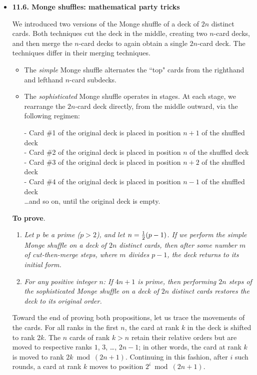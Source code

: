 \begin{itemize}


\medskip\item
{\bf 11.6. Monge shuffles: mathematical party tricks}

\smallskip

We introduced two versions of the Monge shuffle of a deck of $2n$ distinct cards.  Both techniques cut the deck in the middle, creating two $n$-card decks, and then merge the $n$-card decks to again obtain a single $2n$-card deck.  The techniques differ in their merging techniques.
  \begin{itemize}
  \item 
The {\em simple} Monge shuffle alternates the ``top" cards from the righthand and lefthand $n$-card subdecks. 

  \medskip\item
The {\em sophisticated} Monge shuffle operates in stages.  At each stage, we rearrange the $2n$-card deck directly, from the middle outward, via the following regimen:
\smallskip

\noindent
- Card \#1 of the original deck is placed in position $n+1$ of the shuffled deck \\
- Card \#2 of the original deck is placed in position $n$ of the shuffled deck \\
- Card \#3 of the original deck is placed in position $n+2$ of the shuffled deck \\
- Card \#4 of the original deck is placed in position $n-1$ of the shuffled deck \\
\hspace*{.1in} \ldots and so on, until the original deck is empty.
  \end{itemize}

{\bf To prove}.
\begin{enumerate}
\item
{\em Let $p$ be a prime ($p>2$), and let $n = {1 \over 2} (p-1)$.  If we perform the simple Monge shuffle on a deck of $2n$ distinct cards, then after some number $m$ of cut-then-merge steps, where $m$ divides $p-1$, the deck returns to its initial form.}

\medskip\item
{\em For any positive integer $n$:  If $4n+1$ is prime, then performing $2n$ steps of the sophisticated Monge shuffle on a deck of $2n$ distinct cards restores the deck to its original order.}
\end{enumerate}

Toward the end of proving both propositions, let us trace the movements of the cards.  For all ranks in the first $n$, the card at rank $k$ in the deck is shifted to rank $2k$.  The $n$ cards of rank $k > n$ retain their relative orders but are moved to respective ranks $1$, $3$, \ldots, $2n-1$; in other words, the card at rank $k$ is moved to rank $2k \bmod (2n+1)$.  Continuing in this fashion, after $i$ such rounds, a card at rank $k$ moves to position $2^i \bmod (2n+1)$. 


\end{itemize}
